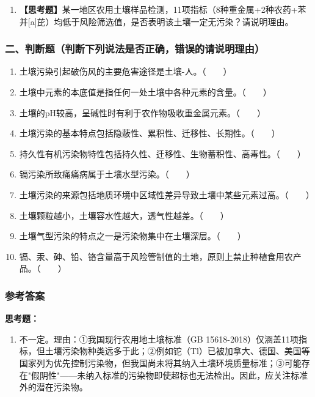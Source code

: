 \documentclass[10pt,a4paper,oneside]{ctexbook}
\begin{document}
\begin{enumerate}[leftmargin=*, itemsep=8pt]
    \item \textbf{【思考题】}某一地区农用土壤样品检测，11项指标（8种重金属+2种农药+苯并[a]芘）均低于风险筛选值，是否表明该土壤一定无污染？请说明理由。
\end{enumerate}

\subsubsection*{二、判断题（判断下列说法是否正确，错误的请说明理由）}

\begin{enumerate}[leftmargin=*, itemsep=8pt]
    \item 土壤污染引起破伤风的主要危害途径是土壤-人。（~~~~）
    \item 土壤中元素的本底值是指任何一处土壤中各种元素的含量。（~~~~）
    \item 土壤的pH较高，呈碱性时有利于农作物吸收重金属元素。（~~~~）
    \item 土壤污染的基本特点包括隐蔽性、累积性、迁移性、长期性。（~~~~）
    \item 持久性有机污染物特性包括持久性、迁移性、生物蓄积性、高毒性。（~~~~）
    \item 镉污染所致痛痛病属于土壤水型污染。（~~~~）
    \item 土壤污染的来源包括地质环境中区域性差异导致土壤中某些元素过高。（~~~~）
    \item 土壤颗粒越小，土壤容水性越大，透气性越差。（~~~~）
    \item 土壤气型污染的特点之一是污染物集中在土壤深层。（~~~~）
    \item 镉、汞、砷、铅、铬含量高于风险管制值的土地，原则上禁止种植食用农产品。（~~~~）
\end{enumerate}

\subsubsection*{参考答案}

\textbf{思考题：}
\begin{enumerate}[leftmargin=*, itemsep=5pt]
    \item 不一定。理由：①我国现行农用地土壤标准（GB 15618-2018）仅涵盖11项指标，但土壤污染物种类远多于此；②例如铊（Tl）已被加拿大、德国、美国等国家列为优先控制污染物，但我国尚未将其纳入土壤环境质量标准；③可能存在"假阴性"——未纳入标准的污染物即使超标也无法检出。因此，应关注标准外的潜在污染物。
\end{enumerate}
\end{document}
